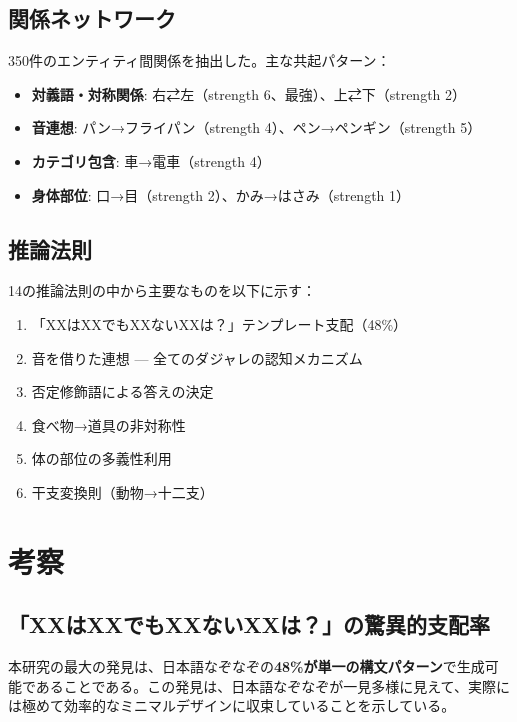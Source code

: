 \documentclass[a4paper,11pt]{ltjsarticle}
\begin{document}
\subsection{関係ネットワーク}

350件のエンティティ間関係を抽出した。主な共起パターン：

\begin{itemize}
    \item \textbf{対義語・対称関係}: 右⇄左（strength 6、最強）、上⇄下（strength 2）
    \item \textbf{音連想}: パン→フライパン（strength 4）、ペン→ペンギン（strength 5）
    \item \textbf{カテゴリ包含}: 車→電車（strength 4）
    \item \textbf{身体部位}: 口→目（strength 2）、かみ→はさみ（strength 1）
\end{itemize}

\subsection{推論法則}

14の推論法則の中から主要なものを以下に示す：

\begin{enumerate}
    \item 「XXはXXでもXXないXXは？」テンプレート支配（48\%）
    \item 音を借りた連想 — 全てのダジャレの認知メカニズム
    \item 否定修飾語による答えの決定
    \item 食べ物→道具の非対称性
    \item 体の部位の多義性利用
    \item 干支変換則（動物→十二支）
\end{enumerate}

\section{考察}

\subsection{「XXはXXでもXXないXXは？」の驚異的支配率}

本研究の最大の発見は、日本語なぞなぞの\textbf{48\%が単一の構文パターン}で生成可能であることである。この発見は、日本語なぞなぞが一見多様に見えて、実際には極めて効率的なミニマルデザインに収束していることを示している。
\end{document}
